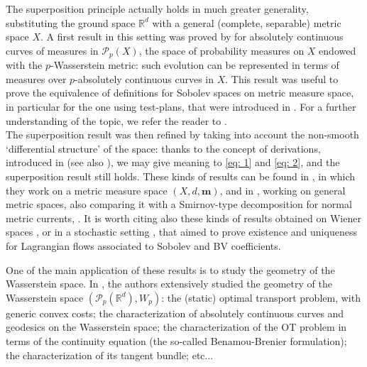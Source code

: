 \documentclass[10pt,leqno]{amsart}
\numberwithin{equation}{section}
\newcommand{\R}{\mathbb{R}}
\newcommand{\PP}{\mathcal{P}}
\newcommand{\m}{\mathbf{m}}
\begin{document}
The superposition principle actually holds in much greater generality, substituting the ground space $\R^d$ with a general (complete, separable) metric space $X$. A first result in this setting was proved by \cite{lisini2007characterization} for absolutely continuous curves of measures in $\PP_p(X)$, the space of probability measures on $X$ endowed with the $p$-Wasserstein metric: such evolution can be represented in terms of measures over $p$-absolutely continuous curves in $X$. This result was useful to prove the equivalence of definitions for Sobolev spaces on metric measure space, in particular for the one using test-plans, that were introduced in \cite{ambrosio2013density, ambrosio2014calculus}. For a further understanding of the topic, we refer the reader to \cite{AmIkLuPa24}. 
\\
The superposition result was then refined 
by taking into account the
non-smooth `differential structure' of the space: thanks to the concept of derivations, introduced in \cite{weaver2000lipschitz} (see also \cite{di2014recent}), we may give meaning to \eqref{eq: 1} and \eqref{eq: 2}, and the superposition result still holds. These kinds of results can be found in \cite{ambrosio2014well}, in which they work on a metric measure space $(X,d,\m)$, and in \cite{stepanov2017three}, working on general metric spaces, also comparing it with a Smirnov-type decomposition for normal metric currents, \cite{smirnov1994decomposition,paolini2012decomposition, paolini2013structure}. It is worth citing also these kinds of results obtained on Wiener spaces \cite{ambrosio2009flows, trevisan2015lagrangian}, or in a stochastic setting \cite{figalli2008existence, trevisan2016well}, that aimed to prove existence and uniqueness for Lagrangian flows associated to Sobolev and BV coefficients. 

One of the main application of these results is to study the geometry of the Wasserstein space. In \cite[Chapters 6-8]{ambrosio2005gradient}, the authors extensively studied the geometry of the Wasserstein space $(\PP_p(\R^d),W_p)$: the (static) optimal transport problem, with generic convex costs; the characterization of absolutely continuous curves and geodesics on the Wasserstein space; the characterization of the OT problem in terms of the continuity equation (the so-called Benamou-Brenier formulation); the characterization of its tangent bundle; etc... %
\end{document}
